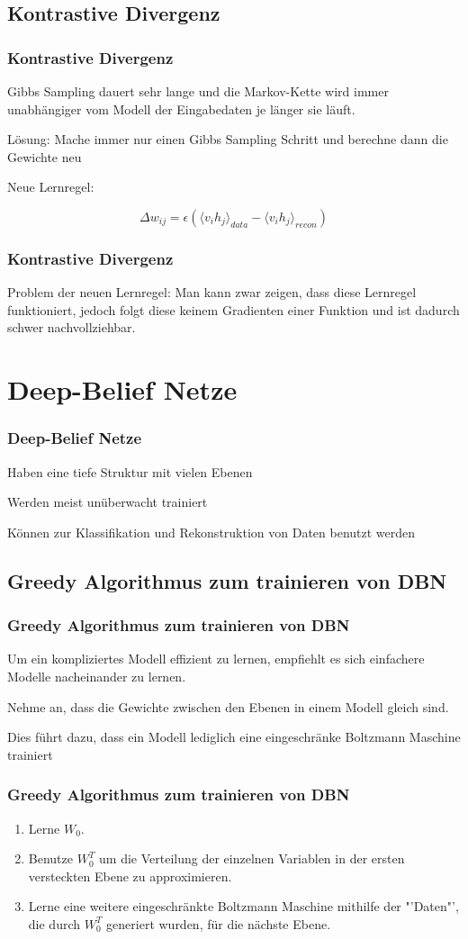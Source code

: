 \documentclass[12pt,titlepage]{beamer}
\begin{document}
	\subsection{Kontrastive Divergenz}
	\begin{frame}
	\frametitle{Kontrastive Divergenz}
	Gibbs Sampling dauert sehr lange und die Markov-Kette wird immer unabhängiger vom Modell der Eingabedaten je länger sie läuft.
	
	Lösung: Mache immer nur einen Gibbs Sampling Schritt und berechne dann die Gewichte neu
	
	Neue Lernregel:
	
	$$\Delta w_{ij} = \epsilon \left( \langle v_i h_j\rangle_{data} - \langle v_i h_j \rangle_{recon}\right)$$
	
	
	\end{frame}
	\begin{frame}
	\frametitle{Kontrastive Divergenz}
	Problem der neuen Lernregel:
	Man kann zwar zeigen, dass diese Lernregel funktioniert, jedoch folgt diese keinem Gradienten einer Funktion und ist dadurch schwer nachvollziehbar.
	\end{frame}
	\section{Deep-Belief Netze}
	\begin{frame}
	\frametitle{Deep-Belief Netze}
	Haben eine tiefe Struktur mit vielen Ebenen
	
	Werden meist unüberwacht trainiert
	
	Können zur Klassifikation und Rekonstruktion von Daten benutzt werden
	\end{frame}
	\subsection{Greedy Algorithmus zum trainieren von DBN}
	\begin{frame}
	\frametitle{Greedy Algorithmus zum trainieren von DBN}
	Um ein kompliziertes Modell effizient zu lernen, empfiehlt es sich einfachere Modelle nacheinander zu lernen. 
	
	Nehme an, dass die Gewichte zwischen den Ebenen in einem Modell gleich sind.
	
	Dies führt dazu, dass ein Modell lediglich eine eingeschränke Boltzmann Maschine trainiert
	\end{frame}
	
	\begin{frame}
	\frametitle{Greedy Algorithmus zum trainieren von DBN}
	\begin{enumerate}
\item Lerne $W_0$.
\item Benutze $W_0^T$ um die Verteilung der einzelnen Variablen in der ersten versteckten Ebene zu approximieren.
\item Lerne eine weitere eingeschränkte Boltzmann Maschine  mithilfe der "'Daten"', die durch $W_0^T$ generiert wurden, für die nächste Ebene.
\end{enumerate}
	\end{frame}
\end{document}
